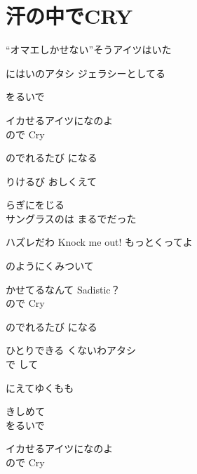 \section{ 汗の中でCRY}
\large{

“オマエしかせない”そうアイツはいた

にはいのアタシ ジェラシーとしてる

をるいで

イカせるアイツになのよ
\\

ので Cry

のでれるたび になる

りけるび おしくえて

らぎにをじる
\\

サングラスのは まるでだった

ハズレだわ Knock me out! もっとくってよ

のようにくみついて

かせてるなんて Sadistic？
\\

ので Cry

のでれるたび になる

ひとりできる くないわアタシ
\\

で して

にえてゆくもも

きしめて
\\

をるいで

イカせるアイツになのよ
\\

ので Cry

}
